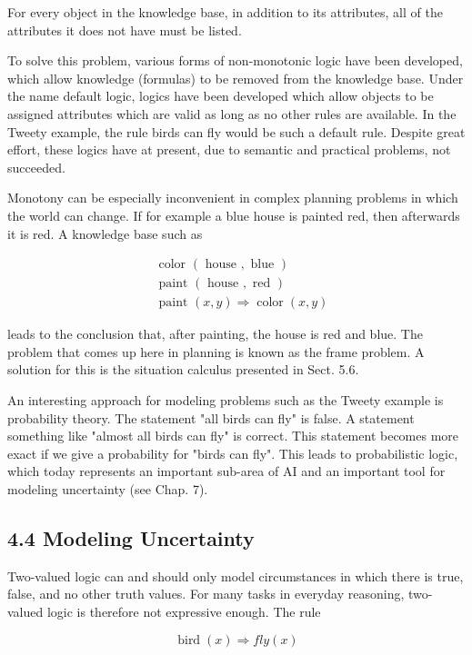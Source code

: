 \documentclass[10pt]{article}
\begin{document}
For every object in the knowledge base, in addition to its attributes, all of the attributes it does not have must be listed.

To solve this problem, various forms of non-monotonic logic have been developed, which allow knowledge (formulas) to be removed from the knowledge base. Under the name default logic, logics have been developed which allow objects to be assigned attributes which are valid as long as no other rules are available. In the Tweety example, the rule birds can fly would be such a default rule. Despite great effort, these logics have at present, due to semantic and practical problems, not succeeded.

Monotony can be especially inconvenient in complex planning problems in which the world can change. If for example a blue house is painted red, then afterwards it is red. A knowledge base such as

$$
\begin{aligned}
& \text { color }(\text { house }, \text { blue }) \\
& \text { paint }(\text { house }, \text { red }) \\
& \text { paint }(x, y) \Rightarrow \operatorname{color}(x, y)
\end{aligned}
$$

leads to the conclusion that, after painting, the house is red and blue. The problem that comes up here in planning is known as the frame problem. A solution for this is the situation calculus presented in Sect. 5.6.

An interesting approach for modeling problems such as the Tweety example is probability theory. The statement "all birds can fly" is false. A statement something like "almost all birds can fly" is correct. This statement becomes more exact if we give a probability for "birds can fly". This leads to probabilistic logic, which today represents an important sub-area of AI and an important tool for modeling uncertainty (see Chap. 7).

\subsection*{4.4 Modeling Uncertainty}
Two-valued logic can and should only model circumstances in which there is true, false, and no other truth values. For many tasks in everyday reasoning, two-valued logic is therefore not expressive enough. The rule

$$
\operatorname{bird}(x) \Rightarrow f l y(x)
$$
\end{document}
